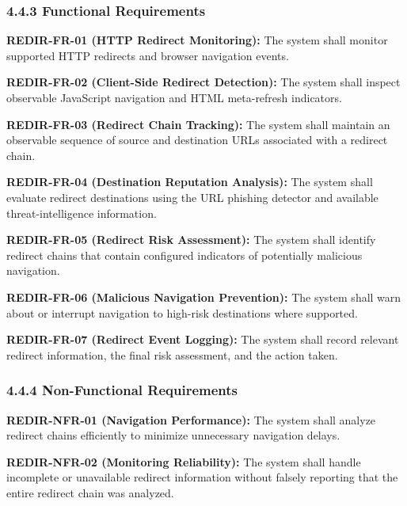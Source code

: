 \documentclass[12pt,a4paper]{report}
\begin{document}
\subsubsection*{4.4.3 Functional Requirements}

\textbf{REDIR-FR-01 (HTTP Redirect Monitoring):} The system shall monitor supported HTTP redirects and browser navigation events.\par

\textbf{REDIR-FR-02 (Client-Side Redirect Detection):} The system shall inspect observable JavaScript navigation and HTML meta-refresh indicators.\par

\textbf{REDIR-FR-03 (Redirect Chain Tracking):} The system shall maintain an observable sequence of source and destination URLs associated with a redirect chain.\par

\textbf{REDIR-FR-04 (Destination Reputation Analysis):} The system shall evaluate redirect destinations using the URL phishing detector and available threat-intelligence information.\par

\textbf{REDIR-FR-05 (Redirect Risk Assessment):} The system shall identify redirect chains that contain configured indicators of potentially malicious navigation.\par

\textbf{REDIR-FR-06 (Malicious Navigation Prevention):} The system shall warn about or interrupt navigation to high-risk destinations where supported.\par

\textbf{REDIR-FR-07 (Redirect Event Logging):} The system shall record relevant redirect information, the final risk assessment, and the action taken.\par

\subsubsection*{4.4.4 Non-Functional Requirements}

\textbf{REDIR-NFR-01 (Navigation Performance):} The system shall analyze redirect chains efficiently to minimize unnecessary navigation delays.\par

\textbf{REDIR-NFR-02 (Monitoring Reliability):} The system shall handle incomplete or unavailable redirect information without falsely reporting that the entire redirect chain was analyzed.\par
\end{document}
